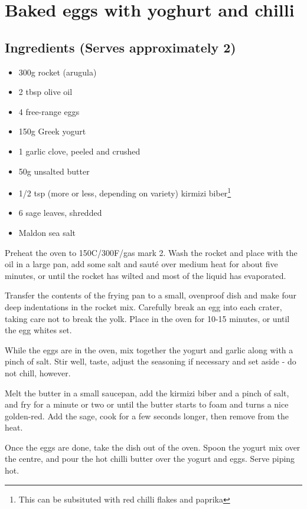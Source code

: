 \section{Baked eggs with yoghurt and chilli}
\author{Yotam Ottolenghi in \it{The Guardian}}


\subsection*{Ingredients (Serves approximately 2)}
\begin{itemize}
  \item 300g rocket (arugula)
  \item 2 tbsp olive oil
  \item 4 free-range eggs
  \item 150g Greek yogurt
  \item 1 garlic clove, peeled and crushed
  \item 50g unsalted butter
  \item 1/2 tsp (more or less, depending on variety) kirmizi biber\footnote{This
    can be subsituted with red chilli flakes and paprika} 
  \item 6 sage leaves, shredded
  \item Maldon sea salt
\end{itemize}

Preheat the oven to 150C/300F/gas mark 2. Wash the rocket and place with the oil in a large pan, add some salt and sauté over medium heat for about five minutes, or until the rocket has wilted and most of the liquid has evaporated.

Transfer the contents of the frying pan to a small, ovenproof dish and make four deep indentations in the rocket mix. Carefully break an egg into each crater, taking care not to break the yolk. Place in the oven for 10-15 minutes, or until the egg whites set.

While the eggs are in the oven, mix together the yogurt and garlic along with a pinch of salt. Stir well, taste, adjust the seasoning if necessary and set aside - do not chill, however.

Melt the butter in a small saucepan, add the kirmizi biber and a pinch of salt, and fry for a minute or two or until the butter starts to foam and turns a nice golden-red. Add the sage, cook for a few seconds longer, then remove from the heat.

Once the eggs are done, take the dish out of the oven. Spoon the yogurt mix over the centre, and pour the hot chilli butter over the yogurt and eggs. Serve piping hot.

